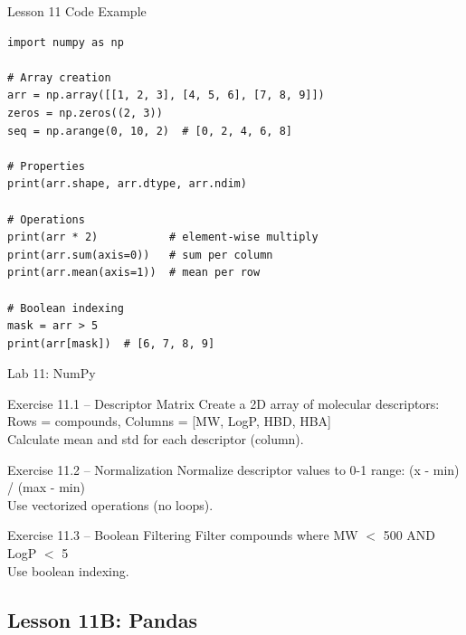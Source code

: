 \documentclass{beamer}
\begin{document}
\begin{frame}[fragile]{Lesson 11 Code Example}
    \small
    \begin{lstlisting}[style=codeStyle]
import numpy as np

# Array creation
arr = np.array([[1, 2, 3], [4, 5, 6], [7, 8, 9]])
zeros = np.zeros((2, 3))
seq = np.arange(0, 10, 2)  # [0, 2, 4, 6, 8]

# Properties
print(arr.shape, arr.dtype, arr.ndim)

# Operations
print(arr * 2)           # element-wise multiply
print(arr.sum(axis=0))   # sum per column
print(arr.mean(axis=1))  # mean per row

# Boolean indexing
mask = arr > 5
print(arr[mask])  # [6, 7, 8, 9]
    \end{lstlisting}
\end{frame}

\begin{frame}{\textcolor{labcolor}{Lab 11: NumPy}}
    \footnotesize
    \begin{block}{Exercise 11.1 -- Descriptor Matrix}
        Create a 2D array of molecular descriptors:\\
        Rows = compounds, Columns = [MW, LogP, HBD, HBA]\\
        Calculate mean and std for each descriptor (column).
    \end{block}
    \vspace{0.2em}
    \begin{block}{Exercise 11.2 -- Normalization}
        Normalize descriptor values to 0-1 range: (x - min) / (max - min)\\
        Use vectorized operations (no loops).
    \end{block}
    \vspace{0.2em}
    \begin{block}{Exercise 11.3 -- Boolean Filtering}
        Filter compounds where MW $<$ 500 AND LogP $<$ 5\\
        Use boolean indexing.
    \end{block}
\end{frame}

\subsection{Lesson 11B: Pandas}
\end{document}
